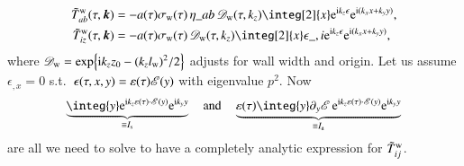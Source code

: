     \begin{equation}\label{eq:pertwalls:gws:Ft_SE_tensor_general}
        \begin{split}
            \Ft{T}\ap{w}_{ab}(\tau, \vec{k}) &=  -a (\tau)\sigma\ped{w}(\tau)  \, \eta\_{ab} \, \mathscr{D}\ped{w}(\tau,k_z) \integ[2]{x} \eu[\im k_z \epsilon] \eu[\im (k_x x+k_y y)], \\
            \Ft{T}\ap{w}_{iz}(\tau, \vec{k})
            &= -a (\tau)\sigma\ped{w}(\tau) \,\mathscr{D}\ped{w}(\tau, k_z)  \integ[2]{x} \epsilon\_{,i}  \eu[\im k_z \epsilon] \eu[\im (k_x x+k_y y)],%
         \end{split}
    \end{equation}
    where $\mathscr{D}_\mathrm{w}= \exp{ \ensuremath{\mathrm{i}}k_z z_0-{(k_z l\ensuremath{_\mathrm{w}})}^2/2 }$ adjusts for wall width and origin. %
    Let us assume $\epsilon_{,x}=0$ s.t.~$\epsilon(\tau,x,y)=\varepsilon(\tau)\mathscr{E}(y)$ with eigenvalue $p^2$. %
    Now
    \begin{equation}
        \underbrace{\integ{y} \eu[\im k_z \varepsilon(\tau) \cdot \sppt(y)] \eu[\im k_y y]}_{\equiv  I\ped{s}}  \quad \text{and}\quad %
        \underbrace{\varepsilon(\tau)\integ{y} \partial_y \sppt\, \eu[\im k_z \varepsilon(\tau) \cdot \sppt(y)] \eu[\im k_y y]}_{\equiv I\ped{a}}
    \end{equation}
    are all we need to solve to have a completely analytic expression for $\tilde{T}^\mathrm{w}_{ij}$.%

